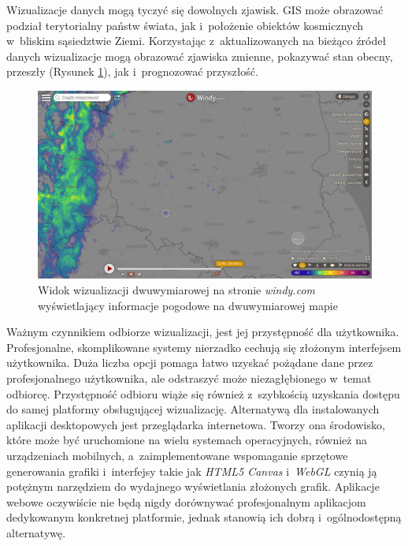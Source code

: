 Wizualizacje danych mogą tyczyć się dowolnych zjawisk. GIS może obrazować podział terytorialny państw świata, jak i~położenie obiektów kosmicznych w~bliskim sąsiedztwie Ziemi. Korzystając z~aktualizowanych na bieżąco źródeł danych wizualizacje mogą obrazować zjawiska zmienne, pokazywać stan obecny, przeszły (Rysunek \ref{fig:c1_windy}), jak i~prognozować przyszłość. 

\begin{figure}[h]
    \centering
    \includegraphics[width=\linewidth]{img/c1_windy.png}
    \caption{Widok wizualizacji dwuwymiarowej na stronie \textit{windy.com} wyświetlający informacje pogodowe na dwuwymiarowej mapie}
    \label{fig:c1_windy}
\end{figure}

Ważnym czynnikiem odbiorze wizualizacji, jest jej przystępność dla użytkownika. Profesjonalne, skomplikowane systemy nierzadko cechują się złożonym interfejsem użytkownika. Duża liczba opcji pomaga łatwo uzyskać pożądane dane przez profesjonalnego użytkownika, ale odstraszyć może niezagłębionego w~temat odbiorcę. Przystępność odbioru wiąże się również z~szybkością uzyskania dostępu do samej platformy obsługującej wizualizację. Alternatywą dla instalowanych aplikacji desktopowych jest przeglądarka internetowa. Tworzy ona środowisko, które może być uruchomione na wielu systemach operacyjnych, również na urządzeniach mobilnych, a~zaimplementowane wspomaganie sprzętowe generowania grafiki i~interfejsy takie jak \textit{HTML5 Canvas}\cite{Canvas} i~\textit{WebGL}\cite{WebGL} czynią ją potężnym narzędziem do wydajnego wyświetlania złożonych grafik. 
Aplikacje webowe oczywiście nie będą nigdy dorównywać profesjonalnym aplikacjom dedykowanym konkretnej platformie, jednak stanowią ich dobrą i~ogólnodostępną alternatywę.

